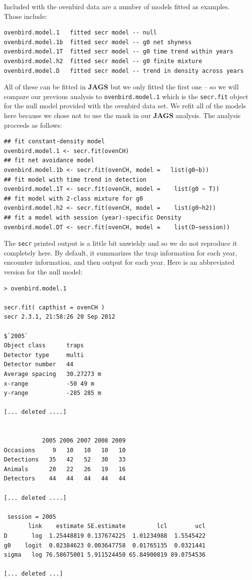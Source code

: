 Included with the ovenbird data are a number of  models fitted as
examples. Those include:
\begin{verbatim}
ovenbird.model.1   fitted secr model -- null
ovenbird.model.1b  fitted secr model -- g0 net shyness
ovenbird.model.1T  fitted secr model -- g0 time trend within years
ovenbird.model.h2  fitted secr model -- g0 finite mixture
ovenbird.model.D   fitted secr model -- trend in density across years
\end{verbatim}
All of these can be fitted in {\bf JAGS} but 
we only fitted the first one -- so we will compare our previous analysis to {\tt ovenbird.model.1} which is the \mbox{\tt secr.fit}
object for the null model provided with the ovenbird data set. We
refit all of the models here because we chose not to use the mask in
our {\bf JAGS} analysis. 
The analysis proceeds as follows:
{\small 
\begin{verbatim}
## fit constant-density model
ovenbird.model.1 <- secr.fit(ovenCH)
## fit net avoidance model
ovenbird.model.1b <- secr.fit(ovenCH, model =   list(g0~b))
## fit model with time trend in detection
ovenbird.model.1T <- secr.fit(ovenCH, model =    list(g0 ~ T))
## fit model with 2-class mixture for g0
ovenbird.model.h2 <- secr.fit(ovenCH, model =    list(g0~h2))
## fit a model with session (year)-specific Density
ovenbird.model.DT <- secr.fit(ovenCH, model =    list(D~session))
\end{verbatim}
}
The \mbox{\tt secr} printed output is a little bit unwieldy and so we
do not reproduce it completely here. By default, it summarizes the
trap information for each year, encounter information, and then output for
each year. Here is an abbreviated version for the null model:
{\small
\begin{verbatim}
> ovenbird.model.1

secr.fit( capthist = ovenCH )
secr 2.3.1, 21:58:26 20 Sep 2012

$`2005`
Object class      traps 
Detector type     multi 
Detector number   44 
Average spacing   30.27273 m 
x-range           -50 49 m 
y-range           -285 285 m 

[... deleted ....]


           2005 2006 2007 2008 2009
Occasions     9   10   10   10   10
Detections   35   42   52   30   33
Animals      20   22   26   19   16
Detectors    44   44   44   44   44

[... deleted ....]

 session = 2005 
       link    estimate SE.estimate         lcl        ucl
D       log  1.25448819 0.137674225  1.01234988  1.5545422
g0    logit  0.02384623 0.003647758  0.01765135  0.0321441
sigma   log 76.58675001 5.911524450 65.84900819 89.0754536

[... deleted ...]
\end{verbatim}
}

